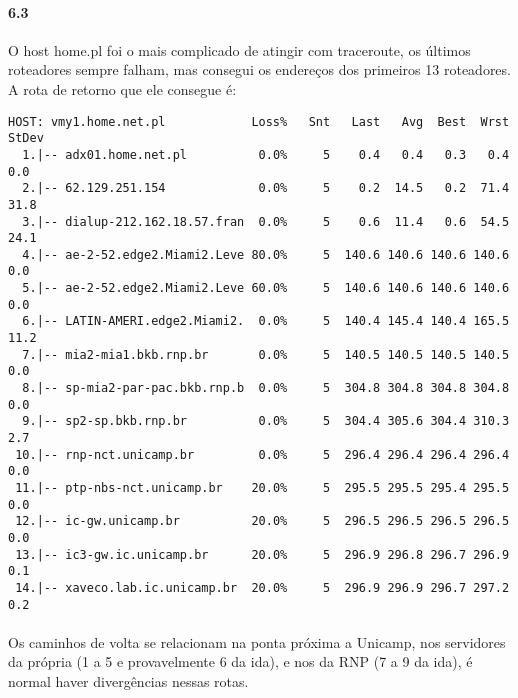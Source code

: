 \documentclass{article}
\begin{document}
\paragraph{6.3} O host home.pl foi o mais complicado de atingir com traceroute, os últimos
roteadores sempre falham, mas consegui os endereços dos primeiros 13 roteadores.
A rota de retorno que ele consegue é:
\begin{verbatim}
HOST: vmy1.home.net.pl            Loss%   Snt   Last   Avg  Best  Wrst StDev
  1.|-- adx01.home.net.pl          0.0%     5    0.4   0.4   0.3   0.4   0.0
  2.|-- 62.129.251.154             0.0%     5    0.2  14.5   0.2  71.4  31.8
  3.|-- dialup-212.162.18.57.fran  0.0%     5    0.6  11.4   0.6  54.5  24.1
  4.|-- ae-2-52.edge2.Miami2.Leve 80.0%     5  140.6 140.6 140.6 140.6   0.0
  5.|-- ae-2-52.edge2.Miami2.Leve 60.0%     5  140.6 140.6 140.6 140.6   0.0
  6.|-- LATIN-AMERI.edge2.Miami2.  0.0%     5  140.4 145.4 140.4 165.5  11.2
  7.|-- mia2-mia1.bkb.rnp.br       0.0%     5  140.5 140.5 140.5 140.5   0.0
  8.|-- sp-mia2-par-pac.bkb.rnp.b  0.0%     5  304.8 304.8 304.8 304.8   0.0
  9.|-- sp2-sp.bkb.rnp.br          0.0%     5  304.4 305.6 304.4 310.3   2.7
 10.|-- rnp-nct.unicamp.br         0.0%     5  296.4 296.4 296.4 296.4   0.0
 11.|-- ptp-nbs-nct.unicamp.br    20.0%     5  295.5 295.5 295.4 295.5   0.0
 12.|-- ic-gw.unicamp.br          20.0%     5  296.5 296.5 296.5 296.5   0.0
 13.|-- ic3-gw.ic.unicamp.br      20.0%     5  296.9 296.8 296.7 296.9   0.1
 14.|-- xaveco.lab.ic.unicamp.br  20.0%     5  296.9 296.9 296.7 297.2   0.2
\end{verbatim}
 \paragraph{} Os caminhos de volta se relacionam na ponta próxima a Unicamp, nos servidores
 da própria (1 a 5 e provavelmente 6 da ida), e nos da RNP (7 a 9 da ida), é normal haver
 divergências nessas rotas.
 
\end{document}
